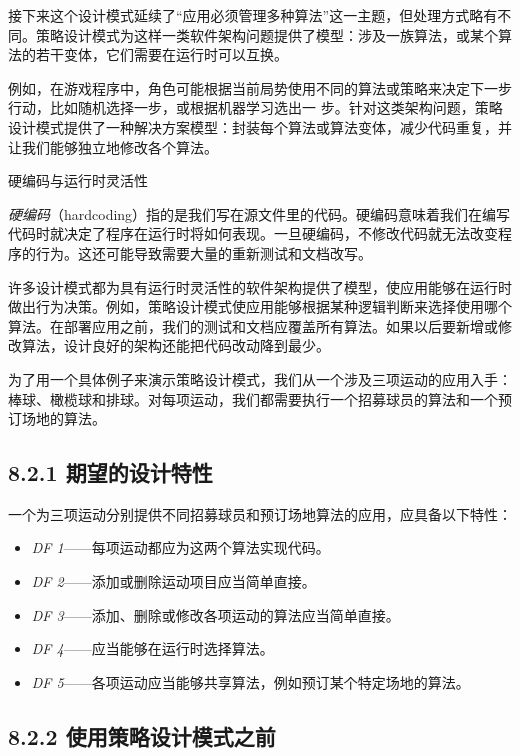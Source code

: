 接下来这个设计模式延续了“应用必须管理多种算法”这一主题，但处理方式略有不同。策略设计模式为这样一类软件架构问题提供了模型：涉及一族算法，或某个算法的若干变体，它们需要在运行时可以互换。

例如，在游戏程序中，角色可能根据当前局势使用不同的算法或策略来决定下一步行动，比如随机选择一步，或根据机器学习选出一 步。针对这类架构问题，策略设计模式提供了一种解决方案模型：封装每个算法或算法变体，减少代码重复，并让我们能够独立地修改各个算法。


\begin{mySidebar}{硬编码与运行时灵活性}

\emph{硬编码}（hardcoding）指的是我们写在源文件里的代码。硬编码意味着我们在编写代码时就决定了程序在运行时将如何表现。一旦硬编码，不修改代码就无法改变程序的行为。这还可能导致需要大量的重新测试和文档改写。

许多设计模式都为具有运行时灵活性的软件架构提供了模型，使应用能够在运行时做出行为决策。例如，策略设计模式使应用能够根据某种逻辑判断来选择使用哪个算法。在部署应用之前，我们的测试和文档应覆盖所有算法。如果以后要新增或修改算法，设计良好的架构还能把代码改动降到最少。
\end{mySidebar}

为了用一个具体例子来演示策略设计模式，我们从一个涉及三项运动的应用入手：棒球、橄榄球和排球。对每项运动，我们都需要执行一个招募球员的算法和一个预订场地的算法。

\subsection{8.2.1 期望的设计特性}

一个为三项运动分别提供不同招募球员和预订场地算法的应用，应具备以下特性：

\begin{itemize}
\item \emph{DF 1}——每项运动都应为这两个算法实现代码。
\item \emph{DF 2}——添加或删除运动项目应当简单直接。
\item \emph{DF 3}——添加、删除或修改各项运动的算法应当简单直接。
\item \emph{DF 4}——应当能够在运行时选择算法。
\item \emph{DF 5}——各项运动应当能够共享算法，例如预订某个特定场地的算法。
\end{itemize}

\subsection{8.2.2 使用策略设计模式之前}

